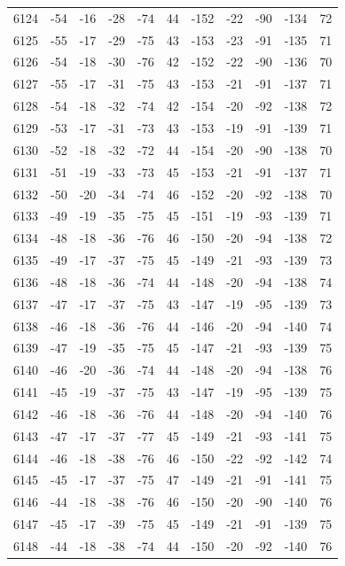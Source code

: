 \begin{table}[H]
\begin{tabular}{lllllllllll}
6124 & -54 & -16 & -28 & -74 & 44 & -152 & -22 & -90 & -134 & 72 \\
6125 & -55 & -17 & -29 & -75 & 43 & -153 & -23 & -91 & -135 & 71 \\
6126 & -54 & -18 & -30 & -76 & 42 & -152 & -22 & -90 & -136 & 70 \\
6127 & -55 & -17 & -31 & -75 & 43 & -153 & -21 & -91 & -137 & 71 \\
6128 & -54 & -18 & -32 & -74 & 42 & -154 & -20 & -92 & -138 & 72 \\
6129 & -53 & -17 & -31 & -73 & 43 & -153 & -19 & -91 & -139 & 71 \\
6130 & -52 & -18 & -32 & -72 & 44 & -154 & -20 & -90 & -138 & 70 \\
6131 & -51 & -19 & -33 & -73 & 45 & -153 & -21 & -91 & -137 & 71 \\
6132 & -50 & -20 & -34 & -74 & 46 & -152 & -20 & -92 & -138 & 70 \\
6133 & -49 & -19 & -35 & -75 & 45 & -151 & -19 & -93 & -139 & 71 \\
6134 & -48 & -18 & -36 & -76 & 46 & -150 & -20 & -94 & -138 & 72 \\
6135 & -49 & -17 & -37 & -75 & 45 & -149 & -21 & -93 & -139 & 73 \\
6136 & -48 & -18 & -36 & -74 & 44 & -148 & -20 & -94 & -138 & 74 \\
6137 & -47 & -17 & -37 & -75 & 43 & -147 & -19 & -95 & -139 & 73 \\
6138 & -46 & -18 & -36 & -76 & 44 & -146 & -20 & -94 & -140 & 74 \\
6139 & -47 & -19 & -35 & -75 & 45 & -147 & -21 & -93 & -139 & 75 \\
6140 & -46 & -20 & -36 & -74 & 44 & -148 & -20 & -94 & -138 & 76 \\
6141 & -45 & -19 & -37 & -75 & 43 & -147 & -19 & -95 & -139 & 75 \\
6142 & -46 & -18 & -36 & -76 & 44 & -148 & -20 & -94 & -140 & 76 \\
6143 & -47 & -17 & -37 & -77 & 45 & -149 & -21 & -93 & -141 & 75 \\
6144 & -46 & -18 & -38 & -76 & 46 & -150 & -22 & -92 & -142 & 74 \\
6145 & -45 & -17 & -37 & -75 & 47 & -149 & -21 & -91 & -141 & 75 \\
6146 & -44 & -18 & -38 & -76 & 46 & -150 & -20 & -90 & -140 & 76 \\
6147 & -45 & -17 & -39 & -75 & 45 & -149 & -21 & -91 & -139 & 75 \\
6148 & -44 & -18 & -38 & -74 & 44 & -150 & -20 & -92 & -140 & 76 \\

\end{tabular}
\end{table}
